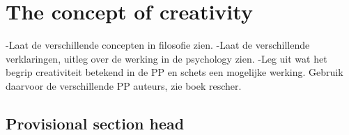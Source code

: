 \documentclass[a4paper]{Thesis}
\begin{document}
	\begin{versionhistory}
	\end{versionhistory}

%

\bigskip
\bigskip
\tableofcontents













\chapter{The concept of creativity}

-Laat de verschillende concepten in filosofie zien.
-Laat de verschillende verklaringen, uitleg over de werking in de psychology zien.
-Leg uit wat het begrip creativiteit betekend in de PP en schets een mogelijke werking. Gebruik daarvoor de verschillende PP auteurs, zie boek rescher.

\section{Provisional section head}
\end{document}
